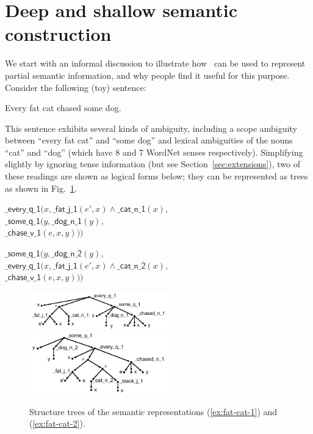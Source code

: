 \newcommand{\sem}[1]{\mathsf{#1}}
\newcommand{\sempred}[1]{\mathrm{#1}}

\section{Deep and shallow semantic construction}
\label{sec:motivation}

We start with an informal discussion to 
illustrate how \rmrs\ can be used to represent partial
semantic information, and why people find it useful for this purpose.
Consider the following (toy) sentence:
\begin{examples}
  \item Every fat cat chased some dog.
\end{examples}

This sentence exhibits several kinds of ambiguity, including a scope
ambiguity between ``every fat cat'' and ``some dog'' and lexical
ambiguities of the nouns ``cat'' and ``dog'' (which have 8 and 7 
WordNet senses respectively).  Simplifying slightly by
ignoring tense information (but see
Section~\ref{sec:extensions}), two of these readings are
shown as logical forms below; they can be represented as trees as
shown in Fig.~\ref{fig:1}.  

\begin{examples}
\item $\sem{\_every\_q\_1}(x, \sem{\_fat\_j\_1}(e',x) \wedge
    \sem{\_cat\_n\_1}(x),$\\
\hspace*{0.1in} $\sem{\_some\_q\_1}(y, \sem{\_dog\_n\_1}(y),$\\
\hspace*{0.2in}$\sem{\_chase\_v\_1}(e,x,y)))$
\label{ex:fat-cat-1}
\item $\sem{\_some\_q\_1}(y, \sem{\_dog\_n\_2}(y),$\\
\hspace*{0.1in}$\sem{\_every\_q\_1}(x, \sem{\_fat\_j\_1}(e',x) \wedge
    \sem{\_cat\_n\_2}(x), $\\
\hspace*{0.2in}$\sem{\_chase\_v\_1}(e,x,y)))$
\label{ex:fat-cat-2}
\end{examples}


\begin{figure}[t]
\includegraphics[width=6cm]{pic-cat-chased-dog}
\hspace{1cm}
\includegraphics[width=6cm]{pic-cat-chased-dog-2}
\caption{Structure trees of the semantic representations (\ref{ex:fat-cat-1}) and
  (\ref{ex:fat-cat-2}). \label{fig:1}}
\end{figure}


